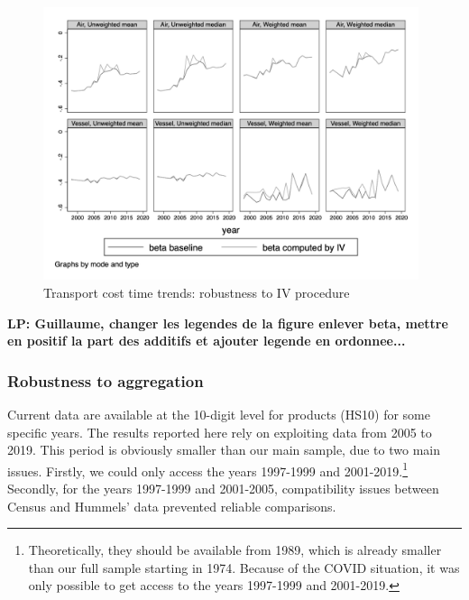\documentclass[a4paper,11pt]{article}
\begin{document}
\begin{figure}[htbp]
\caption{Transport cost time trends: robustness to IV procedure}
\label{fig:comp_IV_SITC5}
\begin{center}
\includegraphics[height=8cm]
{scatter_chronology_baseline_IV_ref1_y_5_3.png}
\end{center}
\end{figure}

\textbf{LP: Guillaume, changer les legendes de la figure enlever beta, mettre en positif la part des additifs et ajouter legende en ordonnee...}


\subsubsection{Robustness to aggregation}

Current data are available at the 10-digit level for products (HS10) for some specific years. The results reported here rely on exploiting data from 2005 to 2019. This period is obviously smaller than our main sample, due to two main issues. Firstly, we could only access the years 1997-1999 and 2001-2019.\footnote{Theoretically, they should be available from 1989, which is already smaller than our full sample starting in 1974. Because of the COVID situation, it was only possible to get access to the years 1997-1999 and 2001-2019.} Secondly, for the years 1997-1999 and 2001-2005, compatibility issues between Census and Hummels' data prevented reliable comparisons.
\end{document}
